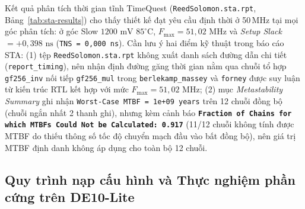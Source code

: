 \documentclass[11pt,a4paper]{report}
\begin{document}
Kết quả phân tích thời gian tĩnh TimeQuest (\texttt{ReedSolomon.sta.rpt}, Bảng~\ref{tab:sta-results}) \cite{quartussta} cho thấy thiết kế đạt yêu cầu định thời ở 50\,MHz tại mọi góc phân tích: ở góc Slow $1200\text{ mV } 85^{\circ}\text{C}$, $F_{\max} = 51{,}02\text{ MHz}$ và \textit{Setup Slack} $= +0{,}398\text{ ns}$ (\texttt{TNS = 0,000 ns}). Cần lưu ý hai điểm kỹ thuật trong báo cáo STA: (1) tệp \texttt{ReedSolomon.sta.rpt} không xuất danh sách đường dẫn chi tiết (\texttt{report\_timing}), nên nhận định đường găng thời gian nằm qua chuỗi tổ hợp \texttt{gf256\_inv} nối tiếp \texttt{gf256\_mul} trong \texttt{berlekamp\_massey} và \texttt{forney} được suy luận từ kiến trúc RTL kết hợp với mức $F_{\max} = 51{,}02\text{ MHz}$; (2) mục \textit{Metastability Summary} ghi nhận \texttt{Worst-Case MTBF = 1e+09 years} trên 12 chuỗi đồng bộ (chuỗi ngắn nhất 2 thanh ghi), nhưng kèm cảnh báo \textbf{\texttt{Fraction of Chains for which MTBFs Could Not be Calculated: 0.917}} (11/12 chuỗi không tính được MTBF do thiếu thông số tốc độ chuyển mạch đầu vào bất đồng bộ), nên giá trị MTBF định danh không áp dụng cho toàn bộ 12 chuỗi.

\begin{table}[!htb]
    \centering
    \caption{Kết quả phân tích thời gian tĩnh (TimeQuest STA) tại xung nhịp 50\,MHz}
    \label{tab:sta-results}
    \footnotesize
\end{table}

\subsection{Quy trình nạp cấu hình và Thực nghiệm phần cứng trên DE10-Lite}
\label{subsec:hw-demo}
\end{document}

